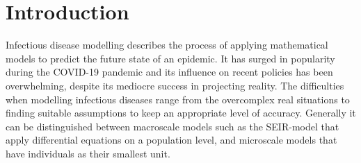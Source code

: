 \section{Introduction}

Infectious disease modelling describes the process of applying mathematical models to predict the future state of an epidemic. 
It has surged in popularity during the COVID-19 pandemic and its influence on recent policies has been overwhelming, despite its mediocre success in projecting reality. 
The difficulties when modelling infectious diseases range from the overcomplex real situations to finding suitable assumptions to keep an appropriate level of accuracy.
Generally it can be distinguished between macroscale models such as the SEIR-model\cite{SEIR_Heidelberg} that apply differential equations on a population level, 
and microscale models that have individuals as their smallest unit.

